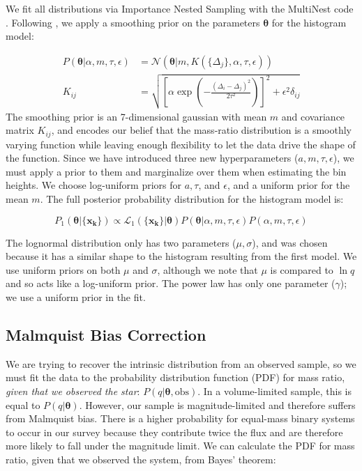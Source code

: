 \documentclass{emulateapj}
\renewcommand{\vec}[1]{\bm{#1}}
\begin{document}
We fit all distributions via Importance Nested Sampling with the MultiNest code \citep{multinest}. Following \citet{Foreman2014}, we apply a smoothing prior on the parameters $\vec{\theta}$ for the histogram model:

\begin{align}
P(\vec{\theta}| \alpha, m, \tau, \epsilon) &= \mathcal{N}(\vec{\theta} | m, K(\{\Delta_j\}, \alpha, \tau, \epsilon)) \\
K_{ij} &= \sqrt{\left[\alpha \exp{\left(-\frac{(\Delta_i - \Delta_j)^2}{2\tau^2}\right)}\right]^2 + \epsilon^2 \delta_{ij}}
\end{align}
The smoothing prior is an 7-dimensional gaussian with mean $m$ and covariance matrix $K_{ij}$, and encodes our belief that the mass-ratio distribution is a smoothly varying function while leaving enough flexibility to let the data drive the shape of the function. Since we have introduced three new hyperparameters ($a, m, \tau, \epsilon$), we must apply a prior to them and marginalize over them when estimating the bin heights. We choose log-uniform priors for $a, \tau$, and $\epsilon$, and a uniform prior for the mean $m$. The full posterior probability distribution for the histogram model is:

\begin{equation}
P_1(\vec{\theta} | \{\vec{x_k}\}) \propto \mathcal{L}_1(\{\vec{x_k}\}| \vec{\theta}) P(\vec{\theta}| \alpha, m, \tau, \epsilon) P(\alpha, m, \tau, \epsilon)
\end{equation}

The lognormal distribution only has two parameters ($\mu, \sigma$), and was chosen because it has a similar shape to the histogram resulting from the first model. We use uniform priors on both $\mu$ and $\sigma$, although we note that $\mu$ is compared to $\ln{q}$ and so acts like a log-uniform prior. The power law has only one parameter ($\gamma$); we use a uniform prior in the fit.

\subsection{Malmquist Bias Correction}

We are trying to recover the intrinsic distribution from an observed sample, so we must fit the data to the probability distribution function (PDF) for mass ratio, \emph{given that we observed the star}: $P(q|\vec{\theta}, \mathrm{obs})$. In a volume-limited sample, this is equal to $P(q|\vec{\theta})$. However, our sample is magnitude-limited and therefore suffers from Malmquist bias. There is a higher probability for equal-mass binary systems to occur in our survey because they contribute twice the flux and are therefore more likely to fall under the magnitude limit. We can calculate the PDF for mass ratio, given that we observed the system, from Bayes' theorem:
\end{document}
